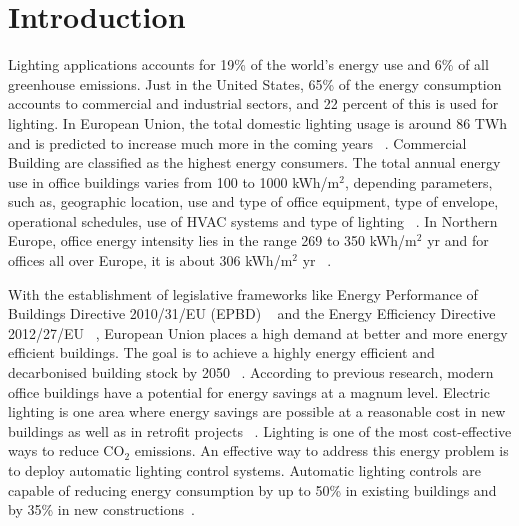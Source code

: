 \chapter{Introduction}
\label{chapter:intro}
Lighting applications accounts for 19\% of the world's energy use and 6\% of all greenhouse emissions. Just in the United States, 65\%  of the energy consumption accounts to commercial and industrial sectors, and 22 percent of this is used for lighting.
In European Union, the total domestic lighting usage is around 86 TWh and is predicted to increase much more in the coming years ~\cite{nieuweling_2016}.
Commercial Building are classified as the highest energy consumers. The total annual energy use in office buildings varies from 100 to 1000 kWh/m$^{2}$, depending parameters, such as, geographic location, use and type of office equipment, type of envelope, operational schedules, use of HVAC systems and type of lighting ~\cite{santamouris2002passive}. 
In Northern Europe, office energy intensity lies in the range 269 to 350 kWh/m$^{2}$ yr and for offices all
over Europe, it is about 306 kWh/m$^{2}$ yr ~\cite{dubois2011energy}.

With the establishment of legislative frameworks like Energy Performance of Buildings Directive 2010/31/EU (EPBD) ~\cite{fernbas_2021} and the Energy Efficiency Directive 2012/27/EU ~\cite{eurlex}, European Union places a high demand at better and more energy efficient buildings. The goal is to achieve a highly energy efficient and decarbonised building stock by 2050 ~\cite{fernbas_2021}.
According to previous research, modern office buildings have a potential for energy savings at a magnum level. Electric lighting is one area where energy savings are possible at a reasonable cost in new buildings as well as in retrofit projects ~\cite{dubois2011energy}. Lighting is one of the most cost-effective ways to reduce CO$_2$ emissions.
An effective way to address this energy problem is to deploy automatic lighting control systems. Automatic lighting controls are capable of reducing energy consumption by up to 50\% in existing buildings and by 35\% in new constructions~\cite{sarkar2008integrated}.

